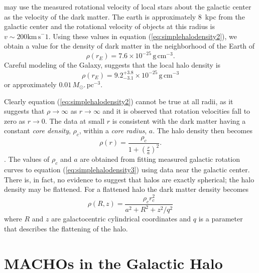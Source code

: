 may use the measured rotational velocity of local stars about the galactic
center as the velocity of the dark matter. The earth is approximately $8$~kpc
from the galactic center and the rotational velocity of objects at this radius
is $v\sim 200\mathrm{km\,s}^-1$. Using these values in equation
(\ref{eq:simplehalodensity2}), we obtain a value for the density of dark
matter in the neighborhood of the Earth of
\begin{equation}
\rho(r_E) = 7.6 \times 10^{-25}\, \mathrm{g}\,\mathrm{cm}^{-3}.
\end{equation}
Careful modeling of the
Galaxy\cite{1995ApJ...449L.123G}, suggests that the local halo density is
\begin{equation}
\rho(r_E) = 9.2_{-3.1}^{+3.8} \times 10^{-25}\, \mathrm{g}\,\mathrm{cm}^{-3}
\end{equation}
or approximately $0.01\,M_\odot.\,\mathrm{pc}^{-3}$.

Clearly equation (\ref{eq:simplehalodensity2}) cannot be true at all radii, as
it suggests that $\rho \rightarrow \infty$ as $r \rightarrow \infty$ and it is
observed that rotation velocities fall to zero as $r\rightarrow 0$. The data
at small $r$ is consistent with the dark matter having a constant \emph{core
density}, $\rho_c$, within a \emph{core radius}, $a$. The halo density then
becomes
\begin{equation}
\rho(r) = \frac{\rho_c}{1 + \left(\frac{r}{a}\right)^2}.
\label{eq:simplehalodensity3}
\end{equation}.
The values of $\rho_c$ and $a$ are obtained from fitting measured galactic
rotation curves to equation (\ref{eq:simplehalodensity3}) using data near the
galactic center.  There is, in fact, no evidence to suggest that halos are
exactly spherical; the halo density may be flattened\cite{Rix:1996}. For a
flattened halo the dark matter density becomes
\begin{equation}
\rho(R,z) = \frac{\rho_c r^2_c}{a^2 + R^2 + z^2/q^2}
\label{eq:simplehalodensity4}
\end{equation}
where $R$ and $z$ are galactocentric cylindrical coordinates and $q$ is a
parameter that describes the flattening of the halo. 
\section{MACHOs in the Galactic Halo}
\label{s:machos}

